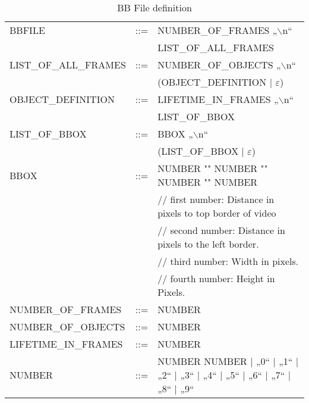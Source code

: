 \begin{table}
  \centering
  \label{bbfiledef} 
  \caption{BB File definition}
   \begin{tabular}[h]{l@{}cl}
      BBFILE   & ::=  & NUMBER\_OF\_FRAMES „$\backslash$n“          \\
               &      & LIST\_OF\_ALL\_FRAMES            \\
      LIST\_OF\_ALL\_FRAMES   & ::= &  NUMBER\_OF\_OBJECTS „$\backslash$n“\\
               &      &       (OBJECT\_DEFINITION $|$ $\varepsilon$) \\
      OBJECT\_DEFINITION  & ::=  & LIFETIME\_IN\_FRAMES „$\backslash$n“ \\
               &      & LIST\_OF\_BBOX                   \\
      LIST\_OF\_BBOX & ::=  & BBOX „$\backslash$n“                  \\
               &     &   (LIST\_OF\_BBOX $|$ $\varepsilon$)       \\
      BBOX     & ::= & NUMBER "\textvisiblespace" NUMBER "\textvisiblespace" NUMBER "\textvisiblespace" NUMBER \\
           &   &// first number: Distance in pixels to top border of video  \\
           &   &// second number: Distance in pixels to the left border.  \\
           &   &// third number: Width in pixels.   \\
           &   &// fourth number: Height in Pixels.  \\
      NUMBER\_OF\_FRAMES & ::=  &  NUMBER\\
      NUMBER\_OF\_OBJECTS & ::= & NUMBER \\
      LIFETIME\_IN\_FRAMES & ::= &NUMBER \\
      NUMBER & ::= & \pbox{12cm}{NUMBER NUMBER $|$ „0“ $|$ „1“ $|$ „2“ $|$ „3“ $|$ „4“ \\$|$ „5“ $|$ „6“ $|$ „7“ $|$ „8“ $|$ „9“} \\
   
   \end{tabular}
 \end{table} 

